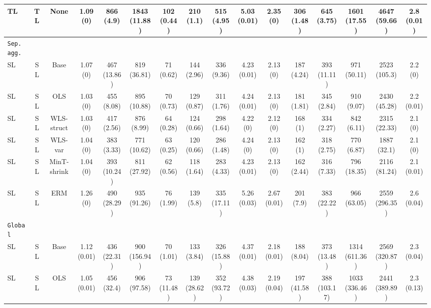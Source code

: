 \documentclass[preprint, 3p, times, twocolumn]{elsarticle}
\begin{document}
\begin{table}
\begin{center}
{{\begin{tabular}{l c cccccccccccccc}
    \hspace{0.1cm} 	TL	&TL	&None	&1.09 (0)	&866 (4.9)	&1843 (11.88)	&102 (0.44)	&210 (1.1)	&515 (4.95)	&5.03 (0.01)	&2.35 (0)	&306 (1.48)	&645 (3.75)	&1601 (17.55)	&4647 (59.66)	&2.8 (0.01)	\\
    \midrule																	
    \texttt{Sep. agg.}																	\\
    \hspace{0.1cm} 	SL	&SL	&Base	&1.07 (0)	&467 (13.86)	&819 (36.81)	&71 (0.62)	&144 (2.96)	&336 (9.36)	&4.23 (0.01)	&2.13 (0)	&187 (4.24)	&393 (11.11)	&971 (50.11)	&2523 (105.3)	&2.2 (0)	\\
    \hspace{0.1cm} 	SL	&SL	&OLS	&1.03 (0)	&455 (8.08)	&895 (10.88)	&70 (0.73)	&129 (0.87)	&311 (1.76)	&4.24 (0.01)	&2.13 (0)	&181 (1.81)	&345 (2.84)	&910 (9.07)	&2430 (45.28)	&2.2 (0.01)	\\
    \hspace{0.1cm} 	SL	&SL	&WLS-struct	&1.03 (0)	&417 (2.56)	&876 (8.99)	&64 (0.28)	&124 (0.66)	&298 (1.64)	&4.22 (0)	&2.12 (0)	&168 (1)	&334 (2.27)	&842 (6.11)	&2315 (22.33)	&2.1 (0)	\\
    \hspace{0.1cm} 	SL	&SL	&WLS-var	&1.04 (0)	&383 (3.33)	&771 (10.62)	&63 (0.25)	&120 (0.66)	&286 (1.48)	&4.24 (0)	&2.13 (0)	&162 (1)	&318 (2.75)	&770 (6.87)	&1887 (32.1)	&2.1 (0)	\\
    \hspace{0.1cm} 	SL	&SL	&MinT-shrink	&1.04 (0)	&393 (10.24)	&811 (27.92)	&62 (0.56)	&118 (1.64)	&283 (4.33)	&4.23 (0.01)	&2.13 (0)	&162 (2.44)	&316 (7.33)	&796 (18.35)	&2116 (81.24)	&2.1 (0.01)	\\
    \hspace{0.1cm} 	SL	&SL	&ERM	&1.26 (0)	&490 (28.29)	&935 (91.26)	&76 (1.99)	&139 (5.8)	&335 (17.11)	&5.26 (0.03)	&2.67 (0.01)	&201 (7.9)	&383 (22.22)	&966 (63.05)	&2559 (296.35)	&2.6 (0.04)	\\
    \midrule																	
    \texttt{Global}																	\\
    \hspace{0.1cm} 	SL	&SL	&Base	&1.12 (0.01)	&436 (22.31)	&900 (156.94)	&70 (1.01)	&133 (3.84)	&326 (15.88)	&4.37 (0.01)	&2.18 (0.01)	&188 (8.04)	&373 (13.48)	&1314 (611.36)	&2569 (320.87)	&2.3 (0.04)	\\
    \hspace{0.1cm} 	SL	&SL	&OLS	&1.05 (0.01)	&456 (32.4)	&906 (97.58)	&73 (11.48)	&139 (28.62)	&352 (93.72)	&4.38 (0.03)	&2.19 (0.04)	&197 (41.58)	&388 (103.17)	&1033 (336.46)	&2441 (389.89)	&2.3 (0.13)	\\

\end{tabular}}}
\end{center}
\end{table}
\end{document}

